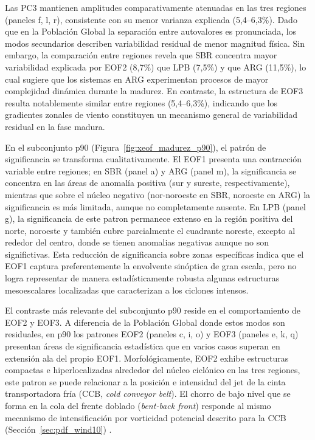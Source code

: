 Las PC3 mantienen amplitudes comparativamente atenuadas en las tres regiones (paneles f, l, r), consistente con su menor varianza explicada (5,4--6,3\%).
Dado que en la Población Global la separación entre autovalores es pronunciada, los modos secundarios describen variabilidad residual de menor magnitud física. 
Sin embargo, la comparación entre regiones revela que SBR concentra mayor variabilidad explicada por EOF2 (8,7\%) que LPB (7,5\%) y que ARG (11,5\%), lo cual sugiere que los sistemas en ARG experimentan procesos de mayor complejidad dinámica durante la madurez.
En contraste, la estructura de EOF3 resulta notablemente similar entre regiones (5,4--6,3\%), indicando que los gradientes zonales de viento constituyen un mecanismo general de variabilidad residual en la fase madura.

En el subconjunto p90 (Figura~\ref{fig:xeof_madurez_p90}), el patrón de significancia se transforma cualitativamente.
El EOF1 presenta una contracción variable entre regiones; en SBR (panel a) y ARG (panel m), la significancia se concentra en las áreas de anomalía positiva (sur y sureste, respectivamente), mientras que sobre el núcleo negativo (nor-noroeste en SBR, noroeste en ARG) la significancia es más limitada, aunque no completamente ausente. 
En LPB (panel g), la significancia de este patron permanece extenso en la región positiva del norte, noroeste y también cubre parcialmente el cuadrante noreste, excepto al rededor del centro, donde se tienen anomalias negativas aunque no son significtivas.
Esta reducción de significancia sobre zonas específicas indica que el EOF1 captura preferentemente la envolvente sinóptica de gran escala, pero no logra representar de manera estadísticamente robusta algunas estructuras mesoescalares localizadas que caracterizan a los ciclones intensos.

El contraste más relevante del subconjunto p90 reside en el comportamiento de EOF2 y EOF3. 
A diferencia de la Población Global donde estos modos son residuales, en p90 los patrones EOF2 (paneles c, i, o) y EOF3 (paneles e, k, q) presentan áreas de significancia estadística que en varios casos superan en extensión ala del propio EOF1.
Morfológicamente, EOF2 exhibe estructuras compactas e hiperlocalizadas alrededor del núcleo ciclónico en las tres regiones, este patron se puede relacionar a la posición e intensidad del jet de la cinta transportadora fría (CCB, \textit{cold conveyor belt}).
El chorro de bajo nivel que se forma en la cola del frente doblado (\textit{bent-back front}) responde al mismo mecanismo de intensificación por vorticidad potencial descrito para la CCB (Sección~\ref{sec:pdf_wind10}) \citep{schemm2014linkage}.

